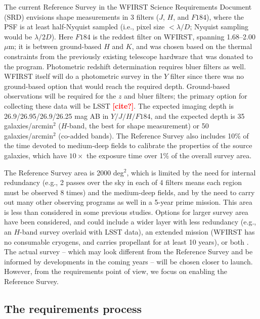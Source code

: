 \documentclass[aps,prd, amsmath,amssymb,superscriptaddress,showkeys,nofootinbib,reprint,preprintnumbers]{revtex4-1}
\newcommand{\verify}[1]{\textcolor{red}{\textbf{{#1}}}}
\begin{document}
The current Reference Survey in the WFIRST Science Requirements Document (SRD) envisions shape measurements in 3 filters ($J$, $H$, and $F184$), where the PSF is at least half-Nyquist sampled (i.e., pixel size $<\lambda/D$; Nyquist sampling would be $\lambda/2D$). Here $F184$ is the reddest filter on WFIRST, spanning 1.68--2.00 $\mu$m; it is between ground-based $H$ and $K$, and was chosen based on the thermal constraints from the previously existing telescope hardware that was donated to the program. Photometric redshift determination requires bluer filters as well. WFIRST itself will do a photometric survey in the $Y$ filter since there was no ground-based option that would reach the required depth. Ground-based observations will be required for the $z$ and bluer filters; the primary option for collecting these data will be LSST \verify{[cite?]}. The expected imaging depth is 26.9/26.95/26.9/26.25 mag AB in $Y/J/H/F184$, and the expected depth is 35 galaxies/arcmin$^2$ ($H$-band, the best for shape measurement) or 50 galaxies/arcmin$^2$ (co-added bands). The Reference Survey also includes 10\% of the time devoted to medium-deep fields to calibrate the properties of the source galaxies, which have $10\times$ the exposure time over 1\% of the overall survey area.

The Reference Survey area is 2000 deg$^2$, which is limited by the need for internal redundancy (e.g., 2 passes over the sky in each of 4 filters means each region must be observed 8 times) and the medium-deep fields, and by the need to carry out many other observing programs as well in a 5-year prime mission. This area is less than considered in some previous studies. Options for larger survey area have been considered, and could include a wider layer with less redundancy (e.g., an $H$-band survey overlaid with LSST data), an extended mission (WFIRST has no consumable cryogens, and carries propellant for at least 10 years), or both \cite{2019BAAS...51c.418E}. The actual survey -- which may look different from the Reference Survey and be informed by developments in the coming years -- will be chosen closer to launch. However, from the requirements point of view, we focus on enabling the Reference Survey.

\subsection{The requirements process}
\label{ss:req}
\end{document}

